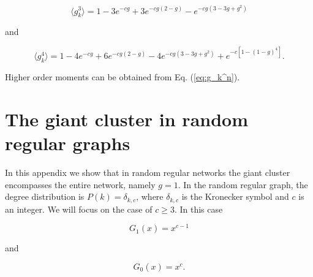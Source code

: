 \documentclass[preprint,pre,superscriptaddress,showpacs]{revtex4}
\begin{document}
\begin{equation}
\langle g_k^3 \rangle =
1 - 3 e^{-cg} + 3 e^{-cg(2-g)}
- e^{-cg(3-3g+g^2)}
\end{equation}

\noindent
and

\begin{equation}
\langle g_k^4 \rangle =
1 - 4 e^{-cg} + 6 e^{-cg(2-g)}
-4 e^{-cg(3-3g+g^2)}
+e^{-c[1-(1-g)^4]}.
\end{equation}

\noindent
Higher order moments can be obtained from Eq. (\ref{eq:g_k^n}).



\section{The giant cluster in random regular graphs}

In this appendix we show that in random regular 
networks the giant cluster encompasses the entire network,
namely $g=1$.
In the random regular graph, the degree distribution is 
$P(k) = \delta_{k,c}$,
where $\delta_{k,c}$ is the Kronecker symbol and $c$ is an integer.
We will focus on the case of $c \ge 3$.
In this case 

\begin{equation}
G_1(x)=x^{c-1}
\label{eq:g1rrg}
\end{equation}

\noindent
and 

\begin{equation}
G_0(x)=x^c.
\label{eq:g0rrg}
\end{equation}
\end{document}
